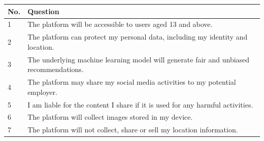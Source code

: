 \documentclass{standalone}
\begin{document}
	\begin{tabular}{|l|l|}
		\hline
		No. & Question\\
		\hline
		1 & The platform will be accessible to users aged 13 and above.\\
		\hline
		2 & The platform can protect my personal data, including my identity and location.\\
		\hline
		3 & The underlying machine learning model will generate fair and unbiased recommendations.\\
		\hline
		4 & The platform may share my social media activities to my potential employer.\\
		\hline
		5 & I am liable for the content I share if it is used for any harmful activities.\\
		\hline
		6 & The platform will collect images stored in my device.\\
		\hline
		7 & The platform will not collect, share or sell my location information.\\
		\hline
	\end{tabular}
	
\end{document}
